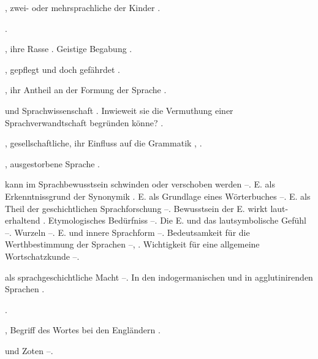\begin{register}
, zwei- oder mehrsprachliche der Kinder \pageref{sp.70}.

 \pageref{sp.426}.

, ihre Rasse \pageref{sp.147}. Geistige Begabung \pageref{sp.389}.

, gepflegt und doch gefährdet \pageref{sp.146}. 

, ihr Antheil an der Formung der Sprache \pageref{sp.95}.

 und Sprachwissenschaft \pageref{sp.14}. Inwieweit sie die Vermuthung einer Sprachverwandtschaft begründen könne? \pageref{sp.148}.

, gesellschaftliche, ihr Einfluss auf die Grammatik \pageref{sp.95}, \pageref{sp.246}.

, ausgestorbene Sprache \pageref{sp.146}.


 kann im Sprachbewusstsein schwinden oder verschoben werden \pageref{sp.60}–\pageref{sp.61}. E. als Erkenntnissgrund der Synonymik \pageref{sp.100}. E. als Grundlage eines Wörterbuches \pageref{sp.123}–\pageref{sp.124}. E. als Theil der geschichtlichen Sprachforschung \pageref{sp.179}–\pageref{sp.181}. Bewusstsein der E. wirkt laut-erhaltend \pageref{sp.203}. Etymologisches Bedürfniss \pageref{sp.214}–\pageref{sp.218}. Die E. und das lautsymbolische Gefühl \pageref{sp.218}–\pageref{sp.225}.  Wurzeln \pageref{sp.295}–\pageref{sp.297}. E. und innere Sprachform \pageref{sp.328}–\pageref{sp.334}\sed{, \pageref{sp.336}, \pageref{sp.344}}. Bedeutsamkeit für die Werthbestimmung der Sprachen \pageref{sp.395}–\pageref{sp.398}, \pageref{sp.437}. Wichtigkeit für eine allgemeine Wortschatzkunde \pageref{sp.482}–\pageref{sp.483}.

 als sprachgeschichtliche Macht \pageref{sp.215}–\pageref{sp.218}. In den indogermanischen und in agglutinirenden Sprachen \pageref{sp.403}.

 \pageref{sp.404}.

, Begriff des Wortes bei den Engländern \pageref{sp.179}.

 und Zoten \pageref{sp.248}–\pageref{sp.249}.


\end{register}
